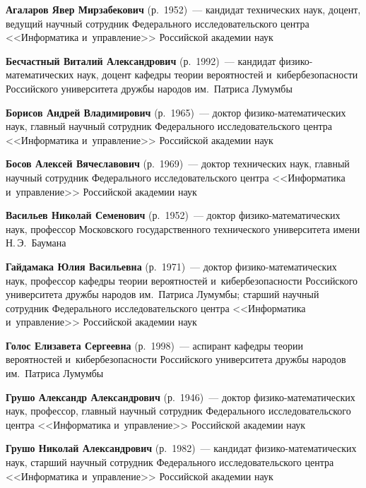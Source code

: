 \begin{multicols}{2}

\noindent
\textbf{Агаларов Явер Мирзабекович} (р.\ 1952)~--- 
кандидат технических наук, доцент, ведущий научный сотрудник Федерального исследовательского цент\-ра 
<<Информатика и~управ\-ле\-ние>> Российской академии наук


\noindent
\textbf{Бесчастный Виталий Александрович} (р.\ 1992)~--- кандидат фи\-зи\-ко-ма\-те\-ма\-ти\-че\-ских наук, 
доцент ка\-фед\-ры тео\-рии вероятностей и~ки\-бер\-безопас\-ности \mbox{Российского} университета дружбы народов им.\ Пат\-ри\-са Лумумбы


\noindent
\textbf{Борисов Андрей Владимирович} (р.\ 1965)~--- 
доктор фи\-зи\-ко-ма\-те\-ма\-ти\-че\-ских наук, глав\-ный научный сотрудник Федерального исследовательского цент\-ра 
<<Информатика и~управ\-ле\-ние>> Российской академии наук

\noindent
\textbf{Босов Алексей Вячеславович} (р.\ 1969)~--- 
доктор технических наук, главный научный сотрудник Федерального исследовательского цент\-ра <<Информатика и~управ\-ле\-ние>> Российской академии наук

\noindent
\textbf{Васильев Николай Семенович} (р.\ 1952)~--- доктор фи\-зи\-ко-ма\-те\-ма\-ти\-че\-ских наук, 
профессор Московского государственного технического университета имени Н.\,Э.~Баумана

\noindent
\textbf{Гайдамака Юлия Васильевна} (р.\ 1971)~--- доктор фи\-зи\-ко-ма\-те\-ма\-ти\-че\-ских наук, 
профессор ка\-фед\-ры тео\-рии вероятностей и~ки\-бер\-безопас\-ности Рос\-сийского университета дружбы народов им.\ Пат\-риса Лумумбы; 
старший научный сотрудник Федераль\-но\-го исследовательского цент\-ра <<Информатика и~управ\-ле\-ние>> Российской академии наук

\noindent
\textbf{Голос Елизавета Сергеевна} (р.\ 1998)~--- 
аспирант кафедры теории вероятностей и~ки\-бер\-безопас\-ности Российского университета дружбы народов им.\ Пат\-ри\-са Лумумбы


\noindent
\textbf{Грушо Александр Александрович} (р.\ 1946)~--- доктор фи\-зи\-ко-ма\-те\-ма\-ти\-че\-ских наук, 
профессор, главный научный сотрудник Федерального исследовательского цент\-ра <<Информатика и~управ\-ле\-ние>>
 Российской академии наук

\noindent
\textbf{Грушо Николай Александрович} (р.\ 1982)~--- кандидат фи\-зи\-ко-ма\-те\-ма\-ти\-че\-ских наук, 
старший научный сотрудник Федерального исследовательского цент\-ра <<Информатика и~управ\-ле\-ние>> Российской академии наук


\end{multicols}
